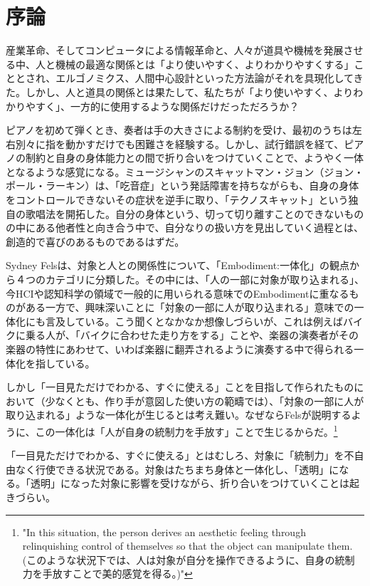 \chapter*{序論}

産業革命、そしてコンピュータによる情報革命と、人々が道具や機械を発展させる中、人と機械の最適な関係とは「より使いやすく、よりわかりやすくする」こととされ、エルゴノミクス、人間中心設計といった方法論がそれを具現化してきた。しかし、人と道具の関係とは果たして、私たちが「より使いやすく、よりわかりやすく」、一方的に使用するような関係だけだっただろうか？

ピアノを初めて弾くとき、奏者は手の大きさによる制約を受け、最初のうちは左右別々に指を動かすだけでも困難さを経験する。しかし、試行錯誤を経て、ピアノの制約と自身の身体能力との間で折り合いをつけていくことで、ようやく一体となるような感覚になる。ミュージシャンのスキャットマン・ジョン（ジョン・ポール・ラーキン）は、「吃音症」という発話障害を持ちながらも、自身の身体をコントロールできないその症状を逆手に取り、「テクノスキャット」という独自の歌唱法を開拓した。自分の身体という、切って切り離すことのできないものの中にある他者性と向き合う中で、自分なりの扱い方を見出していく過程とは、創造的で喜びのあるものであるはずだ。

Sydney Felsは、対象と人との関係性について、「Embodiment:一体化」の観点から４つのカテゴリに分類した。その中には、「人の一部に対象が取り込まれる」、今HCIや認知科学の領域で一般的に用いられる意味でのEmbodimentに重なるものがある一方で、興味深いことに「対象の一部に人が取り込まれる」意味での一体化にも言及している。こう聞くとなかなか想像しづらいが、これは例えばバイクに乗る人が、「バイクに合わせた走り方をする」ことや、楽器の演奏者がその楽器の特性にあわせて、いわば楽器に翻弄されるように演奏する中で得られる一体化を指している。

しかし「一目見ただけでわかる、すぐに使える」ことを目指して作られたものにおいて（少なくとも、作り手が意図した使い方の範疇では）、「対象の一部に人が取り込まれる」ような一体化が生じるとは考え難い。なぜならFelsが説明するように、この一体化は「人が自身の統制力を手放す」ことで生じるからだ。\footnote{"In this situation, the person derives an aesthetic feeling through relinquishing control of themselves so that the object can manipulate them.(このような状況下では、人は対象が自分を操作できるように、自身の統制力を手放すことで美的感覚を得る。)"}

「一目見ただけでわかる、すぐに使える」とはむしろ、対象に「統制力」を不自由なく行使できる状況である。対象はたちまち身体と一体化し、「透明」になる。「透明」になった対象に影響を受けながら、折り合いをつけていくことは起きづらい。

